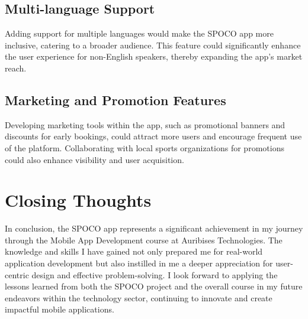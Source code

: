 \documentclass[12pt,a4paper]{report}
\begin{document}
\subsection{Multi-language Support}
Adding support for multiple languages would make the SPOCO app more inclusive, catering to a broader audience. This feature could significantly enhance the user experience for non-English speakers, thereby expanding the app's market reach.

\subsection{Marketing and Promotion Features}
Developing marketing tools within the app, such as promotional banners and discounts for early bookings, could attract more users and encourage frequent use of the platform. Collaborating with local sports organizations for promotions could also enhance visibility and user acquisition.


\section{Closing Thoughts}
In conclusion, the SPOCO app represents a significant achievement in my journey through the Mobile App Development course at Auribises Technologies. The knowledge and skills I have gained not only prepared me for real-world application development but also instilled in me a deeper appreciation for user-centric design and effective problem-solving. I look forward to applying the lessons learned from both the SPOCO project and the overall course in my future endeavors within the technology sector, continuing to innovate and create impactful mobile applications.
\end{document}
